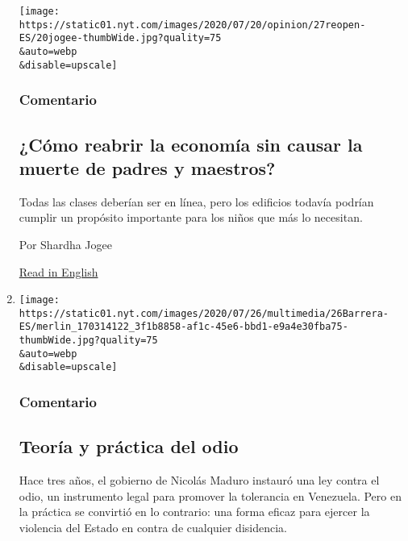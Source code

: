 \begin{enumerate}
  \texttt{[image: https://static01.nyt.com/images/2020/07/20/opinion/27reopen-ES/20jogee-thumbWide.jpg?quality=75\\\&auto=webp\\\&disable=upscale]}

  \hypertarget{comentario-7}{%
  \subsubsection{Comentario}\label{comentario-7}}

  \hypertarget{cuxf3mo-reabrir-la-economuxeda-sin-causar-la-muerte-de-padres-y-maestros}{%
  \subsection{¿Cómo reabrir la economía sin causar la muerte de padres y
  maestros?}\label{cuxf3mo-reabrir-la-economuxeda-sin-causar-la-muerte-de-padres-y-maestros}}

  Todas las clases deberían ser en línea, pero los edificios todavía
  podrían cumplir un propósito importante para los niños que más lo
  necesitan.

  Por Shardha Jogee

  \href{https://www.nytimes.com/2020/07/20/opinion/coronavirus-reopen-schools-economy.html}{Read
  in English}
\item
  \href{/es/2020/07/26/espanol/opinion/nicmer-evans-venezuela.html}{}

  \texttt{[image: https://static01.nyt.com/images/2020/07/26/multimedia/26Barrera-ES/merlin\_170314122\_3f1b8858-af1c-45e6-bbd1-e9a4e30fba75-thumbWide.jpg?quality=75\\\&auto=webp\\\&disable=upscale]}

  \hypertarget{comentario-8}{%
  \subsubsection{Comentario}\label{comentario-8}}

  \hypertarget{teoruxeda-y-pruxe1ctica-del-odio}{%
  \subsection{Teoría y práctica del
  odio}\label{teoruxeda-y-pruxe1ctica-del-odio}}

  Hace tres años, el gobierno de Nicolás Maduro instauró una ley contra
  el odio, un instrumento legal para promover la tolerancia en
  Venezuela. Pero en la práctica se convirtió en lo contrario: una forma
  eficaz para ejercer la violencia del Estado en contra de cualquier
  disidencia.


\end{enumerate}
